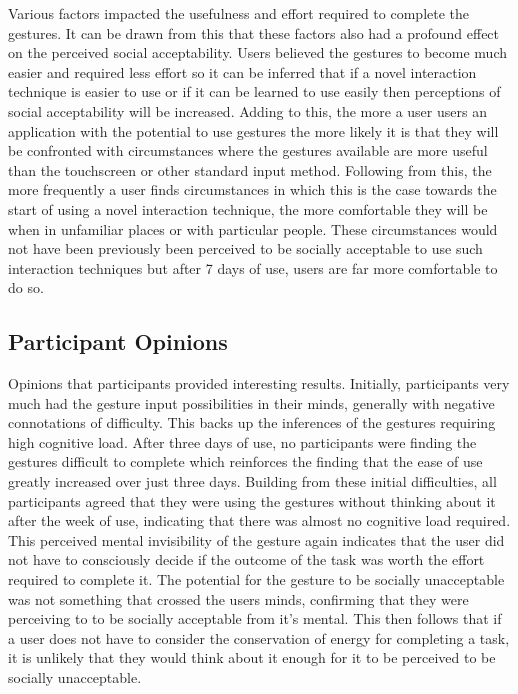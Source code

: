 \documentclass{l4proj}
\begin{document}
Various factors impacted the usefulness and effort required to complete the gestures. It can be drawn from this that these factors also had a profound effect on the perceived social acceptability. Users believed the gestures to become much easier and required less effort so it can be inferred that if a novel interaction technique is easier to use or if it can be learned to use easily then perceptions of social acceptability will be increased. Adding to this, the more a user users an application with the potential to use gestures the more likely it is that they will be confronted with circumstances where the gestures available are more useful than the touchscreen or other standard input method. Following from this, the more frequently a user finds circumstances in which this is the case towards the start of using a novel interaction technique, the more comfortable they will be when in unfamiliar places or with particular people. These circumstances would not have been previously been perceived to be socially acceptable to use such interaction techniques but after 7 days of use, users are far more comfortable to do so.

\subsection{Participant Opinions}

Opinions that participants provided interesting results. Initially, participants very much had the gesture input possibilities in their minds, generally with negative connotations of difficulty. This backs up the inferences of the gestures requiring high cognitive load. After three days of use, no participants were finding the gestures difficult to complete which reinforces the finding that the ease of use greatly increased over just three days. Building from these initial difficulties, all participants agreed that they were using the gestures without thinking about it after the week of use, indicating that there was almost no cognitive load required. This perceived mental invisibility of the gesture again indicates that the user did not have to consciously decide if the outcome of the task was worth the effort required to complete it. The potential for the gesture to be socially unacceptable was not something that crossed the users minds, confirming that they were perceiving to to be socially acceptable from it's mental. This then follows that if a user does not have to consider the conservation of energy for completing a task, it is unlikely that they would think about it enough for it to be perceived to be socially unacceptable.
\end{document}
